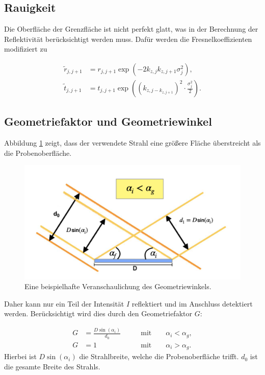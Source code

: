 \documentclass[
  bibliography=totoc,     %
  captions=tableheading,  %
  titlepage=firstiscover, %
]{scrartcl}
\begin{document}
\subsection{Rauigkeit}
Die Oberfläche der Grenzfläche ist nicht perfekt glatt, was in der Berechnung der Reflektivität berücksichtigt werden muss.
Dafür werden die Fresnelkoeffizienten modifiziert zu

\begin{align*}
    \tilde{r}_{j,j+1} &= r_{j,j+1} \exp{\left(-2k_{z,j}k_{z,j+1}\sigma_j^2\right)},\\
    \tilde{t}_{j,j+1} &= t_{j,j+1} \exp{\left(\left(k_{z,j-k_{z,j+1}}\right)^2\cdot\frac{\sigma_j^2}{2}\right)}.
\end{align*}

\subsection{Geometriefaktor und Geometriewinkel}

Abbildung \ref{fig:geo} zeigt, dass der verwendete Strahl eine größere Fläche überstreicht als die Probenoberfläche. 

\begin{figure}
  \centering
  \includegraphics[scale=0.5]{images/anleit.png}
  \caption{Eine beispielhafte Veranschaulichung des Geometriewinkels. \cite{anleitung}}
  \label{fig:geo}
\end{figure} 
\noindent
Daher kann nur ein Teil der Intensität $I$ reflektiert und im Anschluss detektiert werden. Berücksichtigt wird dies
durch den Geometriefaktor $G$:

\begin{align}
    \label{eqn:geome}
    G &= \frac{D\sin{\left(\alpha_i\right)}}{d_0} \qquad &\text{mit} \qquad \alpha_i < \alpha_g,\\
    G &= 1 \qquad &\text{mit} \qquad \alpha_i > \alpha_g.
\end{align}
\noindent
Hierbei ist $D\sin{\left(\alpha_i\right)}$ die Strahlbreite, welche die Probenoberfläche trifft. $d_0$ ist die gesamte
Breite des Strahls.
\end{document}
